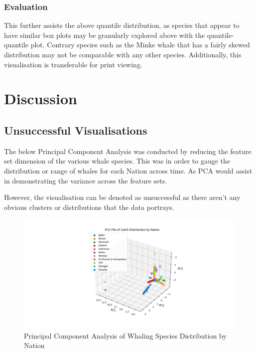 \documentclass[12pt,a4paper]{article}
\begin{document}
\subsubsection{Evaluation}
This further assists the above quantile distribution, as species that appear to have similar box plots may be granularly explored above with the quantile-quantile plot. Contrary species such as the Minke whale that has a fairly skewed distribution may not be comparable with any other species. Additionally, this visualisation is transferable for print viewing. 


\section{Discussion}

\subsection{Unsuccessful Visualisations}

The below Principal Component Analysis was conducted by reducing the feature set dimension of the various whale species. This was in order to gauge the distribution or range of whales for each Nation across time. As PCA would assist in demonstrating the variance across the feature sets. 

However, the visualisation can be denoted as unsuccessful as there aren't any obvious clusters or distributions that the data portrays.

\begin{figure}[H]
    \centering
    \includegraphics[width = 15cm]{Figure_2.png}
    \caption{Principal Component Analysis of Whaling Species Distribution by Nation}
    \label{fig:my_label}
\end{figure}
\end{document}
